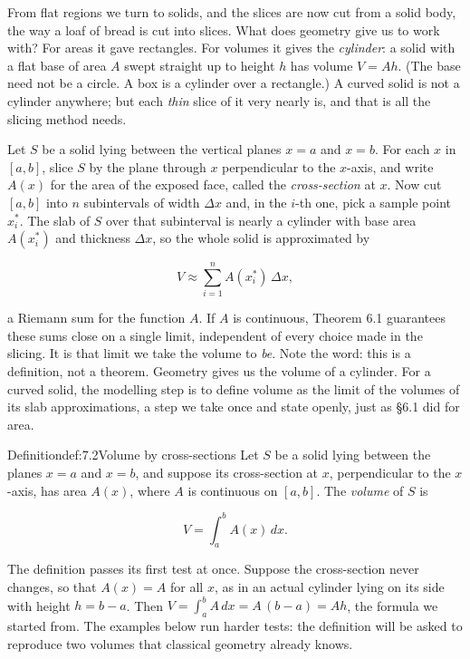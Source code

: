 \documentclass[a4paper,12pt,oneside]{memoir}
\begin{document}
From flat regions we turn to solids, and the slices are now cut from a solid body, the way a loaf of bread is cut into slices. What does geometry give us to work with? For areas it gave rectangles. For volumes it gives the \emph{cylinder}: a solid with a flat base of area \(A\) swept straight up to height \(h\) has volume \(V = Ah\). (The base need not be a circle. A box is a cylinder over a rectangle.) A curved solid is not a cylinder anywhere; but each \emph{thin} slice of it very nearly is, and that is all the slicing method needs.

Let \(S\) be a solid lying between the vertical planes \(x = a\) and \(x = b\). For each \(x\) in \([a, b]\), slice \(S\) by the plane through \(x\) perpendicular to the \(x\)-axis, and write \(A(x)\) for the area of the exposed face, called the \emph{cross-section} at \(x\). Now cut \([a, b]\) into \(n\) subintervals of width \(\Delta x\) and, in the \(i\)-th one, pick a sample point \(x_{i}^{*}\). The slab of \(S\) over that subinterval is nearly a cylinder with base area \(A(x_{i}^{*})\) and thickness \(\Delta x\), so the whole solid is approximated by

\[ V \approx \sum_{i=1}^{n} A(x_{i}^{*})\,\Delta x, \]

a Riemann sum for the function \(A\). If \(A\) is continuous, Theorem 6.1 guarantees these sums close on a single limit, independent of every choice made in the slicing. It is that limit we take the volume to \emph{be}. Note the word: this is a definition, not a theorem. Geometry gives us the volume of a cylinder. For a curved solid, the modelling step is to define volume as the limit of the volumes of its slab approximations, a step we take once and state openly, just as §6.1 did for area.

\begin{envdefinition}{Definition}{def:7.2}{Volume by cross-sections}
Let \(S\) be a solid lying between the planes \(x = a\) and \(x = b\), and suppose its cross-section at \(x\), perpendicular to the \(x\)-axis, has area \(A(x)\), where \(A\) is continuous on \([a, b]\). The \emph{volume} of \(S\) is

\[ V = \int_{a}^{b} A(x)\,dx. \]
\end{envdefinition}
The definition passes its first test at once. Suppose the cross-section never changes, so that \(A(x) = A\) for all \(x\), as in an actual cylinder lying on its side with height \(h = b - a\). Then \(V = \int_{a}^{b} A\,dx = A\,(b - a) = Ah\), the formula we started from. The examples below run harder tests: the definition will be asked to reproduce two volumes that classical geometry already knows.
\end{document}
